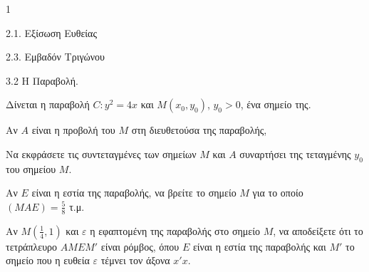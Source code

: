 \begin{ylh}{1}
    \item 2.1. Εξίσωση Ευθείας
    \item 2.3. Εμβαδόν Τριγώνου
    \item 3.2 Η Παραβολή.
\end{ylh}
Δίνεται η παραβολή $C: y^2 = 4x$ και $M(x_0, y_0)$, $y_0 > 0$, ένα σημείο της.
\begin{alist}
    \item Αν $A$ είναι η προβολή του $M$ στη διευθετούσα της παραβολής,
    \begin{rlist}
        \item Να εκφράσετε τις συντεταγμένες των σημείων $M$ και $A$ συναρτήσει της τεταγμένης $y_0$ του σημείου $M$. 
        \item Αν $E$ είναι η εστία της παραβολής, να βρείτε το σημείο $M$ για το οποίο $(MAE) = \frac{5}{8}$ τ.μ. 
    \end{rlist}
    \item Αν $M\left(\frac{1}{4}, 1\right)$ και $\varepsilon$ η εφαπτομένη της παραβολής στο σημείο $M$, να αποδείξετε ότι το τετράπλευρο $AMEM'$ είναι ρόμβος, όπου $E$ είναι η εστία της παραβολής και $M'$ το σημείο που η ευθεία $\varepsilon$ τέμνει τον άξονα $x'x$. 
\end{alist}
